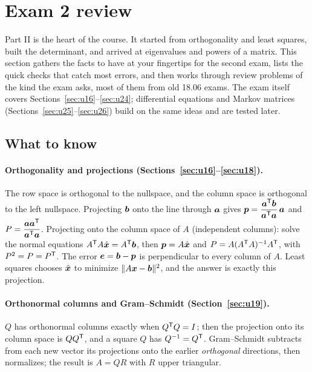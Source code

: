 \section{Exam 2 review}\label{sec:u27}

Part II is the heart of the course. It started from orthogonality and least squares, built
the determinant, and arrived at eigenvalues and powers of a matrix. This section gathers the
facts to have at your fingertips for the second exam, lists the quick checks that catch most
errors, and then works through review problems of the kind the exam asks, most of them from
old 18.06 exams. The exam itself covers Sections~\ref{sec:u16}--\ref{sec:u24}; differential
equations and Markov matrices (Sections~\ref{sec:u25}--\ref{sec:u26}) build on the same
ideas and are tested later.

\subsection{What to know}

\paragraph{Orthogonality and projections (Sections~\ref{sec:u16}--\ref{sec:u18}).}
The row space is orthogonal to the nullspace, and the column space is orthogonal to the left
nullspace.
Projecting $\boldsymbol{b}$ onto the line through $\boldsymbol{a}$ gives
$\boldsymbol{p}=\dfrac{\boldsymbol{a}^{\mathsf{T}}\boldsymbol{b}}{\boldsymbol{a}^{\mathsf{T}}\boldsymbol{a}}\,\boldsymbol{a}$ and $P=\dfrac{\boldsymbol{a}\boldsymbol{a}^{\mathsf{T}}}{\boldsymbol{a}^{\mathsf{T}}\boldsymbol{a}}$.
Projecting onto the column space of $A$ (independent columns): solve the normal equations
$A^{\mathsf{T}} A\hat{\boldsymbol{x}}=A^{\mathsf{T}}\boldsymbol{b}$, then $\boldsymbol{p}=A\hat{\boldsymbol{x}}$ and
$P=A(A^{\mathsf{T}} A)^{-1}A^{\mathsf{T}}$, with $P^{2}=P=P^{\mathsf{T}}$. The error $\boldsymbol{e}=\boldsymbol{b}-\boldsymbol{p}$ is perpendicular
to every column of $A$. Least squares chooses $\hat{\boldsymbol{x}}$ to minimize
$\|A\boldsymbol{x}-\boldsymbol{b}\|^{2}$, and the answer is exactly this projection.

\paragraph{Orthonormal columns and Gram--Schmidt (Section~\ref{sec:u19}).}
$Q$ has orthonormal columns exactly when $Q^{\mathsf{T}} Q=I$; then the projection onto its column space
is $QQ^{\mathsf{T}}$, and a square $Q$ has $Q^{-1}=Q^{\mathsf{T}}$. Gram--Schmidt subtracts from each new vector its
projections onto the earlier \emph{orthogonal} directions, then normalizes; the result is
$A=QR$ with $R$ upper triangular.


